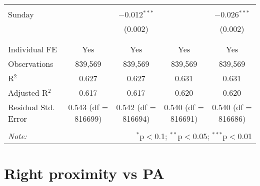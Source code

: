 \documentclass[
]{article}
\begin{document}
\begin{table}[!htbp]
{\begin{tabular}{@{\extracolsep{5pt}}lcccc}
  & & & & \\ 
 Sunday &  & $-$0.012$^{***}$ &  & $-$0.026$^{***}$ \\ 
  &  & (0.002) &  & (0.002) \\ 
  & & & & \\ 
\hline \\[-1.8ex] 
Individual FE & Yes & Yes & Yes & Yes \\ 
Observations & 839,569 & 839,569 & 839,569 & 839,569 \\ 
R$^{2}$ & 0.627 & 0.627 & 0.631 & 0.631 \\ 
Adjusted R$^{2}$ & 0.617 & 0.617 & 0.620 & 0.620 \\ 
Residual Std. Error & 0.543 (df = 816699) & 0.542 (df = 816694) & 0.540 (df = 816691) & 0.540 (df = 816686) \\ 
\hline 
\hline \\[-1.8ex] 
\textit{Note:}  & \multicolumn{4}{r}{$^{*}$p$<$0.1; $^{**}$p$<$0.05; $^{***}$p$<$0.01} \\ 
\end{tabular}
} 
\end{table} 
\newpage
\section{Right proximity vs PA}
\end{document}

